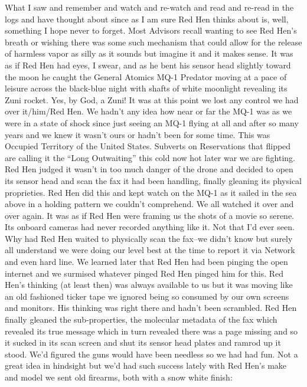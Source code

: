 \documentclass[13pt|draft]{report}
\begin{document}
What I saw and remember and watch and re-watch and read and re-read in the logs and have thought about since as I am sure Red Hen thinks about is, well, something I hope never to forget. Most Advisors recall wanting to see Red Hen's breath or wishing there was some such mechanism that could allow for the release of harmless vapor as silly as it sounds but imagine it and it makes sense. It was as if Red Hen had eyes, I swear, and as he bent his sensor head slightly toward the moon he caught the General Atomics MQ-1 Predator moving at a pace of leisure across the black-blue night with shafts of white moonlight revealing its Zuni rocket. Yes, by God, a Zuni! It was at this point we lost any control we had over it/him/Red Hen. We hadn't any idea how near or far the MQ-1 was as we were in a state of shock since just seeing an MQ-1 flying at all and after so many years and we knew it wasn't ours or hadn't been for some time. This was Occupied Territory of the United States. Subverts on Reservations that flipped are calling it the ``Long Outwaiting'' this cold now hot later war we are fighting. Red Hen judged it wasn't in too much danger of the drone and decided to open its sensor head and scan the fax it had been handling, finally gleaning its physical proprieties. Red Hen did this and kept watch on the MQ-1 as it sailed in the sea above in a holding pattern we couldn't comprehend. We all watched it over and over again. It was as if Red Hen were framing us the shots of a movie so serene. Its onboard cameras had never recorded anything like it. Not that I'd ever seen. Why had Red Hen waited to physically scan the fax--we didn't know but surely all understand we were doing our level best at the time to report it via Network and even hard line. We learned later that Red Hen had been pinging the open internet and we surmised whatever pinged Red Hen pinged him for this. Red Hen's thinking (at least then) was always available to us but it was moving like an old fashioned ticker tape we ignored being so consumed by our own screens and monitors. His thinking was right there and hadn't been scrambled.  Red Hen finally gleaned the sub-properties, the molecular metadata of the fax which revealed its true message which in turn revealed there was a page missing and so it sucked in its scan screen and shut its sensor head plates and ramrod up it stood. We'd figured the guns would have been needless so we had had fun. Not a great idea in hindsight but we'd had such success lately with Red Hen's make and model we sent old firearms, both with a snow white finish:
\end{document}
